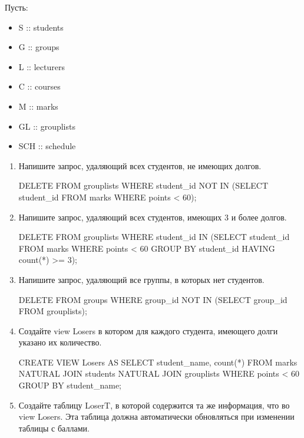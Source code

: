 \documentclass[10pt, a4paper]{article}
\title{}
\author{Андрей Козлов, гр. 4538}
\date{}
\begin{document}
\maketitle

Пусть:
\begin{itemize}
	\item S :: students
	\item G :: groups
	\item L :: lecturers
	\item C :: courses
	\item M :: marks
	\item GL :: grouplists
	\item SCH :: schedule
\end{itemize}

\begin{enumerate}

	\item {Напишите запрос, удаляющий всех студентов, не имеющих долгов.

	\begin{sql}
DELETE FROM grouplists WHERE student_id NOT IN
	(SELECT student_id FROM marks WHERE points < 60);
	\end{sql}
	}

	\item {Напишите запрос, удаляющий всех студентов, имеющих 3 и более долгов.

	\begin{sql}
DELETE FROM grouplists WHERE student_id IN
	(SELECT student_id FROM marks WHERE points < 60
	GROUP BY student_id HAVING count(*) >= 3);
	\end{sql}
	}

	\item {Напишите запрос, удаляющий все группы, в которых нет студентов.

	\begin{sql}
DELETE FROM groups WHERE group_id NOT IN
	(SELECT group_id FROM grouplists);
	\end{sql}
	}

	\item {Создайте view Losers в котором для каждого студента, имеющего долги указано их количество.

	\begin{sql}
CREATE VIEW Losers AS SELECT student_name, count(*) FROM
	marks NATURAL JOIN students NATURAL JOIN grouplists
		WHERE points < 60 GROUP BY student_name;
	\end{sql}
	}

	\item {Создайте таблицу LoserT, в которой содержится та же информация, что во view Losers. Эта таблица должна автоматически обновляться при изменении таблицы с баллами.

}
\end{enumerate}
\end{document}
